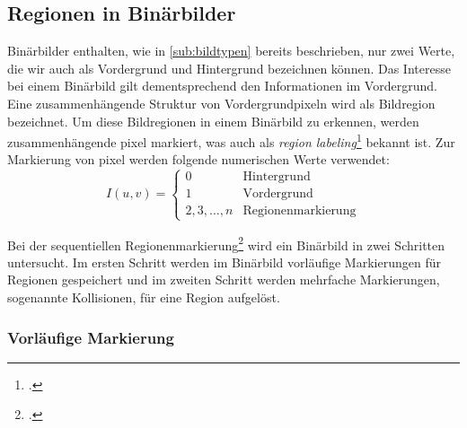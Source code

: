 \subsection{Regionen in Binärbilder} %
\label{sec:regionen_in_binärbilder}

Binärbilder enthalten, wie in \autoref{sub:bildtypen} bereits beschrieben, nur zwei Werte, die wir auch als Vordergrund
 und Hintergrund bezeichnen können. Das Interesse bei einem Binärbild gilt dementsprechend den Informationen im
 Vordergrund. Eine zusammenhängende Struktur von Vordergrundpixeln wird als Bildregion bezeichnet. Um diese
 Bildregionen in einem Binärbild zu erkennen, werden zusammenhängende \gls{pixel} markiert, was auch als
 \textit{region labeling}\footcite[Vgl.][S.~196]{burger05} bekannt ist. Zur Markierung von \gls{pixel} werden folgende
 numerischen Werte verwendet:
\begin{equation*}
	I(u,v) = \begin{cases}
	0 & \textrm{Hintergrund}\\
	1 & \textrm{Vordergrund}\\
	2,3,\ldots,n & \textrm{Regionenmarkierung}
	\end{cases}
\end{equation*}

Bei der sequentiellen Regionenmarkierung\footcite[Vgl.][S.~200--206]{burger05} wird ein Binärbild in zwei Schritten
 untersucht. Im ersten Schritt werden im Binärbild vorläufige Markierungen für Regionen gespeichert und im zweiten
 Schritt werden mehrfache Markierungen, sogenannte Kollisionen, für eine Region aufgelöst.

\subsubsection{Vorläufige Markierung} %
\label{sec:vorläufige_makierung}

